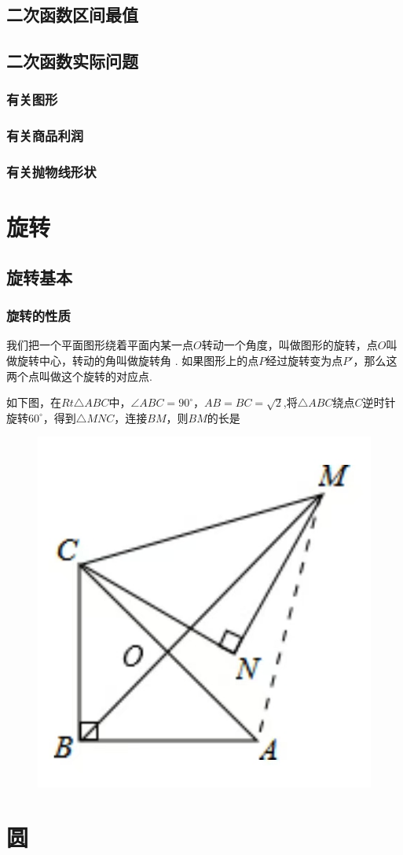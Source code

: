 \documentclass[lang=cn, 10pt, titlestyle=display, oneside, toc=twocol]{elegantbook}
\begin{document}
\section{二次函数区间最值}

\section{二次函数实际问题}


\subsection*{有关图形}

\subsection*{有关商品利润}

\subsection*{有关抛物线形状}


\chapter{旋转}

\section{旋转基本}

\subsection{旋转的性质}

我们把一个平面图形绕着平面内某一点\(O \)转动一个角度，叫做图形的旋转，点\(O \)叫做旋转中心，转动的角叫做旋转角 . 如果图形上的点\(P \)经过旋转变为点\(P' \)，那么这两个点叫做这个旋转的对应点.

\begin{example}
    如下图，在\(Rt\triangle ABC \)中，\(\angle ABC = 90^\circ \)，\(AB=BC=\sqrt{2}\),将\(\triangle ABC\)绕点\(C\)逆时针旋转\(60^\circ\)，得到\(\triangle MNC\)，连接\(BM\)，则\(BM\)的长是 \underline{\hspace{3em}}
    
\begin{figure}[h]
    \raggedright
    \includegraphics[width=0.25\linewidth]{figure/example_rotation1.jpg}
    
    \label{fig:enter-label}
\end{figure}
    
\end{example}



\chapter{圆}
\end{document}

